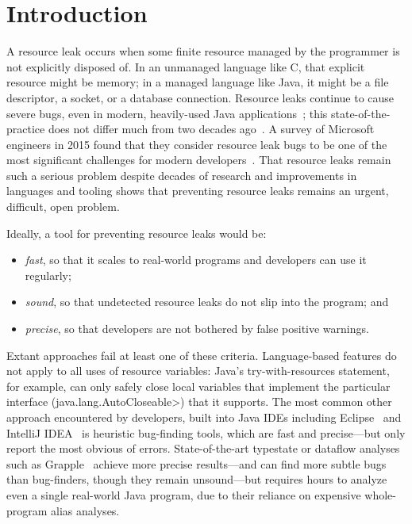 \section{Introduction}
\label{sec:intro}


A resource leak occurs when some finite resource managed by the
programmer is not explicitly disposed of. In an unmanaged language
like C, that explicit resource might be memory; in a managed language
like Java, it might be a file descriptor, a socket, or a database
connection.  Resource leaks continue to cause severe bugs, even in
modern, heavily-used Java applications~\cite{ghanavati2020memory};
this state-of-the-practice does not differ much from two decades
ago~\cite{WeimerN04}.  A survey of Microsoft engineers in 2015 found
that they consider resource leak bugs to be one of the most
significant challenges for modern developers~\cite{LoNZ2015}.  That
resource leaks remain such a serious problem despite decades of
research and improvements in languages and tooling shows that
preventing resource leaks remains an urgent, difficult, open problem.


Ideally, a tool for preventing resource leaks would be:
\begin{itemize}
\item \emph{fast}, so that it scales to real-world programs and
  developers can use it regularly;
\item \emph{sound}, so that undetected resource leaks do not slip into
  the program; and
\item \emph{precise}, so that developers are not bothered by false positive
  warnings.
\end{itemize}


Extant approaches fail at least one of these criteria.
Language-based features do not apply to all uses of resource variables:
Java's try-with-resources statement, for example, can
only safely close local variables that implement the particular
interface (\<java.lang.AutoCloseable>) that it supports.
The most common other
approach encountered by developers, built into Java IDEs including
Eclipse~\cite{ecj-resource-leak} and IntelliJ
IDEA~\cite{idea-resource-leak} is heuristic bug-finding tools, which
are fast and precise---but only report the most obvious of
errors. State-of-the-art typestate or dataflow analyses such as
Grapple~\cite{zuo2019grapple} achieve more precise results---and
can find more subtle bugs than bug-finders, though they remain unsound---but
requires hours to analyze even a single real-world Java program, due
to their reliance on expensive whole-program alias analyses.

